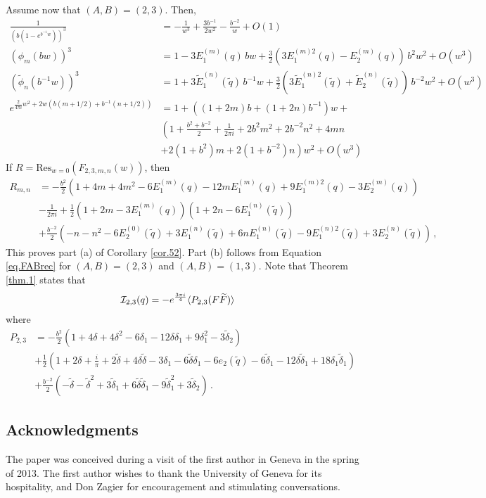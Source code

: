 \documentclass[12pt]{amsart}
\theoremstyle{definition}
\def\printname#1{
        \if\draft y
                \smash{\makebox[0pt]{\hspace{-0.5in}
                        \raisebox{8pt}{\tt\tiny #1}}}
        \fi
}
\def\lbl#1{\label{#1}\printname{#1}}
\def\calI{\mathcal I}
\def\la{\langle}
\def\ra{\rangle}
\def\ti{\widetilde}
\def\tq{\tilde{q}}
\def\Res{\mathrm{Res}}
\def\d{\delta}
\begin{document}
Assume now that $(A,B)=(2,3)$. Then,
\begin{align*}
\frac{1}{(b(1-e^{b^{-1}w}))^3} &= -\frac{1}{w^3} +\frac{3b^{-1}}{2w^2} 
-\frac{b^{-2}}{w} 
+O(1)
\\
\left( \phi_m(b w) \right)^3 &=
1-3 E^{(m)}_1(q) \, b w + \frac{3}{2} \left(3 E^{(m)2}_1(q) -
E^{(m)}_2(q)\right) \, b^2 w^2 + O(w^3) \\
(\ti \phi_n(b^{-1} w))^3 &= 
1+3 \ti E^{(n)}_1(\tq) \, b^{-1} w
+ \frac{3}{2} \left(3 \ti E^{(n)2}_1(\tq) +
\ti E^{(n)}_2(\tq)\right) \, b^{-2} w^2 + O(w^3)
\\
e^{\frac{2}{4 \pi i} w^2 + 2 w (b (m+1/2) + b^{-1} (n+1/2))} &=
1+\left((1+2m)b  +(1 + 2 n) b^{-1}\right) w + \\
& \left(1 + \frac{b^2+b^{-2}}{2} +\frac{1}{2 \pi i} + 2 b^2 m^2 + 2 b^{-2} n^2
+ 4 m n \right. \\
& \left. + 2(1+b^2) m + 2(1+b^{-2}) n \right) w^2 + O(w^3) 
\end{align*}
If $R=\Res_{w=0}(F_{2,3,m,n}(w))$, then
{\small
\begin{align*}
R_{m,n} &= -\frac{b^2}{2} \left(
1 + 4 m + 4 m^2   - 6 E^{(m)}_1(q) - 12 m  E^{(m)}_1(q) + 9 E^{(m)2}_1(q) - 3 
E^{(m)}_2(q) \right)
\\
& - \frac{1}{2 \pi i} +  \frac{1}{2}
\left(1 + 2 m - 3 E^{(m)}_1(q)\right)\left(1 + 2 n -6 E^{(n)}_1(\tq)\right) 
\\
& + \frac{b^{-2}}{2} \left( - n - n^2 -6 E^{(0)}_2(\tq) + 3 E^{(n)}_1(\tq) 
+6 n E^{(n)}_1(\tq) - 9 E^{(n)2}_1(\tq) + 3 E^{(n)}_2(\tq) \right) \,,
\end{align*}
}
This proves part (a) of Corollary \ref{cor.52}. Part (b) follows from
Equation \eqref{eq.FABrec} for $(A,B)=(2,3)$ and $(A,B)=(1,3)$.
Note that Theorem \ref{thm.1} states that
\begin{align}
\lbl{eq.52R}
\calI_{2,3}(q)& = 
-e^{\frac{3 \pi i}{4}} \la P_{2,3} (F \ti F) \ra
\end{align}
where 
\begin{align*}
P_{2,3} &= -\frac{b^2}{2} 
\left( 
1+4 \d+4 \d^2-6 \d_1-12 \d \d_1+9 \d_1^2-3 \ti\d_2
\right)
\\
& + \frac{1}{2} 
\left( 
1+2 \d+\frac{i}{\pi} +2 \ti\d+4 \d \ti\d-3 \d_1-6 \ti\d \d_1
-6 e_2(\tq)-6 \ti\d_1-12 \d \ti\d_1+18 \d_1 \ti\d_1
\right)
\\
& + \frac{b^{-2}}{2}
\left( 
-\ti\d-\ti\d^2+3 \ti\d_1+6 \ti\d \ti\d_1-9 \ti\d_1^2+3 \ti\d_2
\right) \,.
\end{align*}


\subsection*{Acknowledgments}
The paper was conceived during a visit of the first author in Geneva
in the spring of 2013. The first author wishes to thank the University of
Geneva for its hospitality, and Don Zagier for encouragement and 
stimulating conversations.




%

\end{document}
